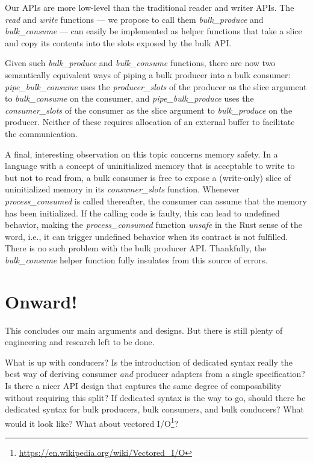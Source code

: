 \documentclass[sigplan,screen,10pt,anonymous,review]{acmart}
\begin{document}
Our APIs are more low-level than the traditional reader and writer APIs. The \textit{read} and \textit{write} functions --- we propose to call them \textit{bulk\_produce} and \textit{bulk\_consume} --- can easily be implemented as helper functions that take a slice and copy its contents into the slots exposed by the bulk API.

Given such \textit{bulk\_produce} and \textit{bulk\_consume} functions, there are now two semantically equivalent ways of piping a bulk producer into a bulk consumer: \textit{pipe\_bulk\_consume} uses the \textit{producer\_slots} of the producer as the slice argument to \textit{bulk\_consume} on the consumer, and \textit{pipe\_bulk\_produce} uses the \textit{consumer\_slots} of the consumer as the slice argument to \textit{bulk\_produce} on the producer. Neither of these requires allocation of an external buffer to facilitate the communication.

A final, interesting observation on this topic concerns memory safety. In a language with a concept of uninitialized memory that is acceptable to write to but not to read from, a bulk consumer is free to expose a (write-only) slice of uninitialized memory in its \textit{consumer\_slots} function. Whenever \textit{process\_consumed} is called thereafter, the consumer can assume that the memory has been initialized. If the calling code is faulty, this can lead to undefined behavior, making the \textit{process\_consumed} function \textit{unsafe} in the Rust sense of the word, i.e., it can trigger undefined behavior when its contract is not fulfilled. There is no such problem with the bulk producer API. Thankfully, the \textit{bulk\_consume} helper function fully insulates from this source of errors.

\section{Onward!}\label{fun}

This concludes our main arguments and designs. But there is still plenty of engineering and research left to be done.

What is up with conducers? Is the introduction of dedicated syntax really the best way of deriving consumer \textit{and} producer adapters from a single specification? Is there a nicer API design that captures the same degree of composability without requiring this split? If dedicated syntax is the way to go, should there be dedicated syntax for bulk producers, bulk consumers, and bulk conducers? What would it look like? What about vectored I/O\footnote{\url{https://en.wikipedia.org/wiki/Vectored_I/O}}?
\end{document}
